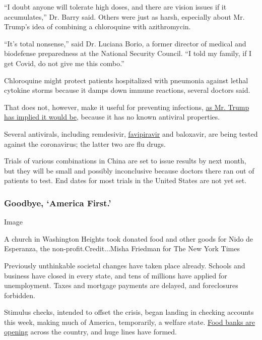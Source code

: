 ``I doubt anyone will tolerate high doses, and there are vision issues
if it accumulates,'' Dr. Barry said. Others were just as harsh,
especially about Mr. Trump's idea of combining a chloroquine with
azithromycin.

``It's total nonsense,'' said Dr. Luciana Borio, a former director of
medical and biodefense preparedness at the National Security Council.
``I told my family, if I get Covid, do not give me this combo.''

Chloroquine might protect patients hospitalized with pneumonia against
lethal cytokine storms because it damps down immune reactions, several
doctors said.

That does not, however, make it useful for preventing infections,
\href{http://transcripts.cnn.com/TRANSCRIPTS/2004/05/sitroom.02.html}{as
Mr. Trump has implied it would be}, because it has no known antiviral
properties.

Several antivirals, including remdesivir,
\href{https://www.scmp.com/tech/science-research/article/3051820/chinese-trials-gileads-antiviral-drug-treat-coronavirus-still}{favipiravir}
and baloxavir, are being tested against the coronavirus; the latter two
are flu drugs.

Trials of various combinations in China are set to issue results by next
month, but they will be small and possibly inconclusive because doctors
there ran out of patients to test. End dates for most trials in the
United States are not yet set.

\hypertarget{goodbye-america-first}{%
\subsubsection{Goodbye, `America First.'}\label{goodbye-america-first}}

Image

A church in Washington Heights took donated food and other goods for
Nido de Esperanza, the non-profit.Credit...Misha Friedman for The New
York Times

Previously unthinkable societal changes have taken place already.
Schools and business have closed in every state, and tens of millions
have applied for unemployment. Taxes and mortgage payments are delayed,
and foreclosures forbidden.

Stimulus checks, intended to offset the crisis, began landing in
checking accounts this week, making much of America, temporarily, a
welfare state.
\href{https://www.nytimes3xbfgragh.onion/2020/04/08/business/economy/coronavirus-food-banks.html}{Food
banks are opening} across the country, and huge lines have formed.

